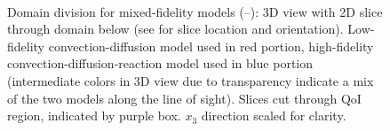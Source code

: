 \documentclass[review,sort&compress]{elsarticle}
\begin{document}
\begin{figure}[htbp]
{\label{subfig:3DMF2}
} 
\hfill
{} \\
\hfill
{}

\caption{Domain division for mixed-fidelity models (\protect{}--\protect{}): 3D view with 2D slice through domain below (see \protect{} for slice location and orientation). Low-fidelity convection-diffusion model used in red portion, high-fidelity convection-diffusion-reaction model used in blue portion (intermediate colors in 3D view due to transparency indicate a mix of the two models along the line of sight). Slices cut through QoI region, indicated by purple box. $x_3$ direction scaled for clarity.}
\label{fig:divvy3D_diffmesh}
\end{figure}
%
\end{document}
